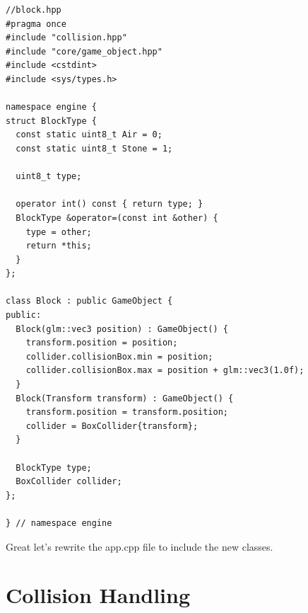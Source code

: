 \documentclass[12pt]{report} \usepackage{preamble}
\begin{document}
\begin{lstlisting}[Language=C++]
//block.hpp
#pragma once
#include "collision.hpp"
#include "core/game_object.hpp"
#include <cstdint>
#include <sys/types.h>

namespace engine {
struct BlockType {
  const static uint8_t Air = 0;
  const static uint8_t Stone = 1;

  uint8_t type;

  operator int() const { return type; }
  BlockType &operator=(const int &other) {
    type = other;
    return *this;
  }
};

class Block : public GameObject {
public:
  Block(glm::vec3 position) : GameObject() {
    transform.position = position;
    collider.collisionBox.min = position;
    collider.collisionBox.max = position + glm::vec3(1.0f);
  }
  Block(Transform transform) : GameObject() {
    transform.position = transform.position;
    collider = BoxCollider{transform};
  }

  BlockType type;
  BoxCollider collider;
};

} // namespace engine
\end{lstlisting}

Great let's rewrite the app.cpp file to include the new classes.

\section{Collision Handling}

\printbibliography
\end{document}

